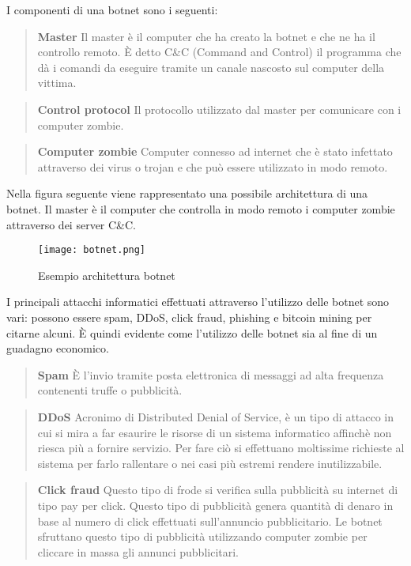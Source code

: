 \documentclass[../main.tex]{subfiles}
\begin{document}
I componenti di una botnet sono i seguenti:

\begin{verse}
				\textbf{Master} Il master è il computer che ha creato la botnet e che ne ha il controllo remoto. È detto C\&C (Command and Control) il programma che dà i comandi da eseguire tramite un canale nascosto sul computer della vittima.
\end{verse}

\begin{verse}
				\textbf{Control protocol} Il protocollo utilizzato dal master per comunicare con i computer zombie.
\end{verse}

\begin{verse}
				\textbf{Computer zombie} Computer connesso ad internet che è stato infettato attraverso dei virus o trojan e che può essere utilizzato in modo remoto. 
\end{verse}

Nella figura seguente viene rappresentato una possibile architettura di una botnet. Il master è il computer che controlla in modo remoto i computer zombie attraverso dei server C\&C.
\begin{figure}[H]
				\centering
				\texttt{[image: botnet.png]}
				\caption{Esempio architettura botnet}
\end{figure}

I principali attacchi informatici effettuati attraverso l'utilizzo delle botnet sono vari: possono essere spam, DDoS, click fraud, phishing e bitcoin mining per citarne alcuni. È quindi evidente come l'utilizzo delle botnet sia al fine di un guadagno economico.

\begin{verse}
				\textbf{Spam} È l'invio tramite posta elettronica di messaggi ad alta frequenza contenenti truffe o pubblicità.
\end{verse}

\begin{verse}
				\textbf{DDoS} Acronimo di Distributed Denial of Service, è un tipo di attacco in cui si mira a far esaurire le risorse di un sistema informatico affinchè non riesca più a fornire servizio. Per fare ciò si effettuano moltissime richieste al sistema per farlo rallentare o nei casi più estremi rendere inutilizzabile.
\end{verse}

\begin{verse}
				\textbf{Click fraud} Questo tipo di frode si verifica sulla pubblicità su internet di tipo pay per click. Questo tipo di pubblicità genera quantità di denaro in base al numero di click effettuati sull'annuncio pubblicitario. Le botnet sfruttano questo tipo di pubblicità utilizzando computer zombie per cliccare in massa gli annunci pubblicitari.
\end{verse}
\end{document}
